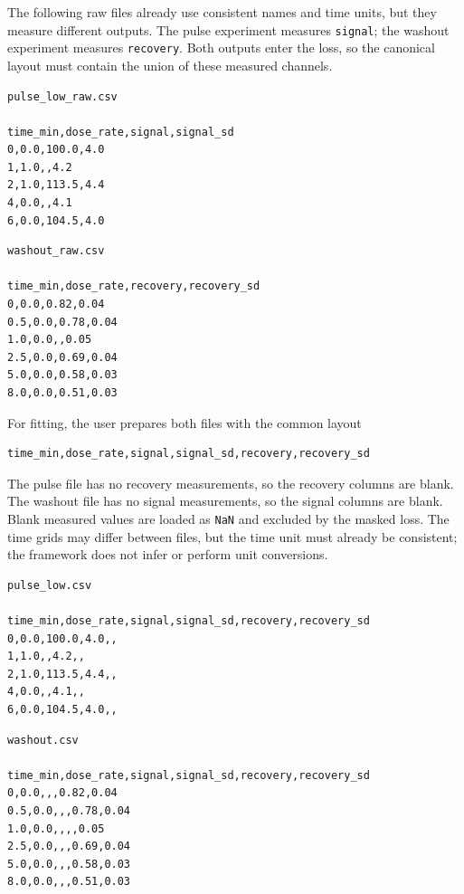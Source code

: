 The following raw files already use consistent names and time units, but they
measure different outputs. The pulse experiment measures \texttt{signal}; the
washout experiment measures \texttt{recovery}. Both outputs enter the loss, so
the canonical layout must contain the union of these measured channels.

\noindent
\begin{minipage}[t]{0.49\textwidth}
\small
\begin{verbatim}
pulse_low_raw.csv

time_min,dose_rate,signal,signal_sd
0,0.0,100.0,4.0
1,1.0,,4.2
2,1.0,113.5,4.4
4,0.0,,4.1
6,0.0,104.5,4.0
\end{verbatim}
\end{minipage}\hfill
\begin{minipage}[t]{0.49\textwidth}
\small
\begin{verbatim}
washout_raw.csv

time_min,dose_rate,recovery,recovery_sd
0,0.0,0.82,0.04
0.5,0.0,0.78,0.04
1.0,0.0,,0.05
2.5,0.0,0.69,0.04
5.0,0.0,0.58,0.03
8.0,0.0,0.51,0.03
\end{verbatim}
\end{minipage}

For fitting, the user prepares both files with the common layout

\begin{verbatim}
time_min,dose_rate,signal,signal_sd,recovery,recovery_sd
\end{verbatim}

The pulse file has no recovery measurements, so the recovery columns are blank.
The washout file has no signal measurements, so the signal columns are blank.
Blank measured values are loaded as \texttt{NaN} and excluded by the masked
loss. The time grids may differ between files, but the time unit must already be
consistent; the framework does not infer or perform unit conversions.

\noindent
\begin{minipage}[t]{0.49\textwidth}
\small
\begin{verbatim}
pulse_low.csv

time_min,dose_rate,signal,signal_sd,recovery,recovery_sd
0,0.0,100.0,4.0,,
1,1.0,,4.2,,
2,1.0,113.5,4.4,,
4,0.0,,4.1,,
6,0.0,104.5,4.0,,
\end{verbatim}
\end{minipage}\hfill
\begin{minipage}[t]{0.49\textwidth}
\small
\begin{verbatim}
washout.csv

time_min,dose_rate,signal,signal_sd,recovery,recovery_sd
0,0.0,,,0.82,0.04
0.5,0.0,,,0.78,0.04
1.0,0.0,,,,0.05
2.5,0.0,,,0.69,0.04
5.0,0.0,,,0.58,0.03
8.0,0.0,,,0.51,0.03
\end{verbatim}
\end{minipage}

